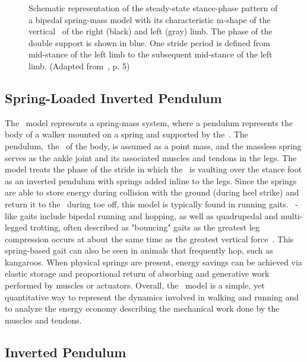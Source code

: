 \begin{figure}[htb]%
    \centering%
    
    \caption{Schematic representation of the steady-state stance-phase pattern of a bipedal spring-mass model with its characteristic m-shape of the vertical~ of the right (black) and left (gray) limb. The phase of the double support is shown in blue. One stride period is defined from mid-stance of the left limb to the subsequent mid-stance of the left limb. (Adapted from~\cite{Lee2018}, p. 5)}
    \label{fig:grf}%
\end{figure}%

    \subsection{Spring-Loaded Inverted Pendulum}

    The~ model represents a spring-mass system, where a pendulum represents the body of a walker mounted on a spring and supported by the~. The pendulum,~\ie the~ of the body, is assumed as a point mass, and the massless spring serves as the ankle joint and its associated muscles and tendons in the legs. The model treats the phase of the stride in which the~ is vaulting over the stance foot as an inverted pendulum with springs added inline to the legs. Since the springs are able to store energy during collision with the ground (\ie during heel strike) and return it to the~ during toe off, this model is typically found in running gaits.~\cite{Blickhan1989} -like gaits include bipedal running and hopping, as well as quadrupedal and multi-legged trotting, often described as "bouncing" gaits as the greatest leg compression occurs at about the same time as the greatest vertical force~\cite{McMahon1990}. This spring-based gait can also be seen in animals that frequently hop, such as kangaroos. When physical springs are present, energy savings can be achieved via elastic storage and proportional return of absorbing and generative work performed by muscles or actuators. Overall, the~ model is a simple, yet quantitative way to represent the dynamics involved in walking and running and to analyze the energy economy describing the mechanical work done by the muscles and tendons.~\cite{Blickhan1989}

    \subsection{Inverted Pendulum}

